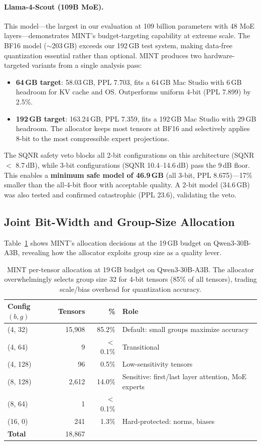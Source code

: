\documentclass{article}
\begin{document}
\paragraph{Llama-4-Scout (109B MoE).} This model---the largest in our evaluation at 109 billion parameters with 48 MoE layers---demonstrates MINT's budget-targeting capability at extreme scale. The BF16 model (${\sim}$203\,GB) exceeds our 192\,GB test system, making data-free quantization essential rather than optional. MINT produces two hardware-targeted variants from a single analysis pass:
\begin{itemize}
    \item \textbf{64\,GB target}: 58.03\,GB, PPL 7.703, fits a 64\,GB Mac Studio with 6\,GB headroom for KV cache and OS. Outperforms uniform 4-bit (PPL 7.899) by 2.5\%.
    \item \textbf{192\,GB target}: 163.24\,GB, PPL 7.359, fits a 192\,GB Mac Studio with 29\,GB headroom. The allocator keeps most tensors at BF16 and selectively applies 8-bit to the most compressible expert projections.
\end{itemize}
The SQNR safety veto blocks all 2-bit configurations on this architecture (SQNR $<$ 8.7\,dB), while 3-bit configurations (SQNR 10.4--14.6\,dB) pass the 9\,dB floor. This enables a \textbf{minimum safe model of 46.9\,GB} (all 3-bit, PPL 8.675)---17\% smaller than the all-4-bit floor with acceptable quality. A 2-bit model (34.6\,GB) was also tested and confirmed catastrophic (PPL 23.6), validating the veto.

\subsection{Joint Bit-Width and Group-Size Allocation}
\label{sec:allocation_detail}

Table~\ref{tab:allocation} shows MINT's allocation decisions at the 19\,GB budget on Qwen3-30B-A3B, revealing how the allocator exploits group size as a quality lever.

\begin{table}[h]
\centering
\caption{MINT per-tensor allocation at 19\,GB budget on Qwen3-30B-A3B. The allocator overwhelmingly selects group size 32 for 4-bit tensors (85\% of all tensors), trading scale/bias overhead for quantization accuracy.}
\label{tab:allocation}
\begin{tabular}{lrrl}
\toprule
Config $(b, g)$ & Tensors & \% & Role \\
\midrule
(4, 32) & 15{,}908 & 85.2\% & Default: small groups maximize accuracy \\
(4, 64) & 9 & $<$0.1\% & Transitional \\
(4, 128) & 96 & 0.5\% & Low-sensitivity tensors \\
(8, 128) & 2{,}612 & 14.0\% & Sensitive: first/last layer attention, MoE experts \\
(8, 64) & 1 & $<$0.1\% & \\
(16, 0) & 241 & 1.3\% & Hard-protected: norms, biases \\
\midrule
\textbf{Total} & 18{,}867 & & \\
\bottomrule
\end{tabular}
\end{table}
\end{document}
